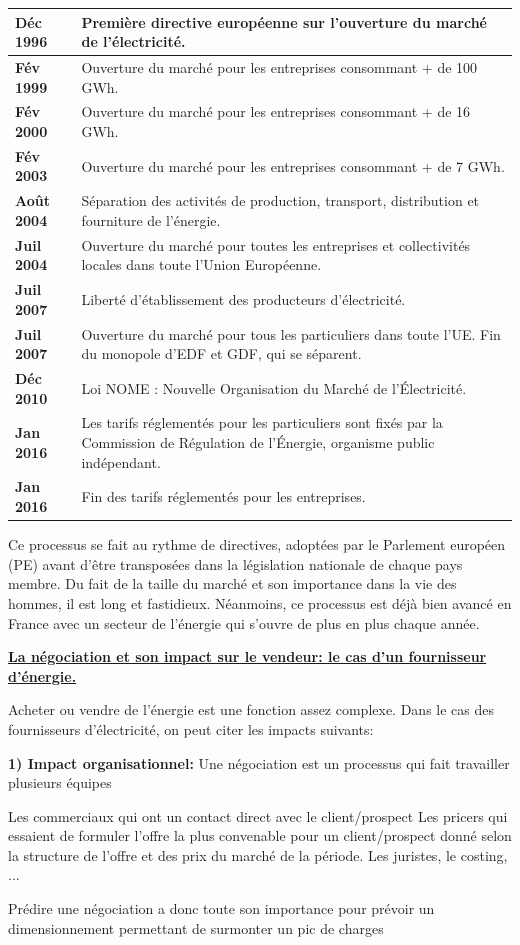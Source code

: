 \documentclass[12pt]{article}
\begin{document}
{\begin{center}
\begin{tabular}{|p{2cm}|p{13cm}|}
  \textbf{Déc 1996} & Première directive européenne sur l'ouverture du marché de l'électricité. \\
  \hline
 \textbf{Fév 1999} & Ouverture du marché pour les entreprises consommant + de 100 GWh. \\
  \hline
  \textbf{Fév 2000} & Ouverture du marché pour les entreprises consommant + de 16 GWh. \\
  \hline
 \textbf{Fév 2003} & Ouverture du marché pour les entreprises consommant + de 7 GWh. \\
  \hline
  \textbf{Août 2004} &	Séparation des activités de production, transport, distribution et fourniture de l'énergie.\\
  \hline
  \textbf{Juil 2004} & Ouverture du marché pour toutes les entreprises et collectivités locales dans toute l'Union Européenne.\\
  \hline
  \textbf{Juil 2007} & Liberté d'établissement des producteurs d'électricité.\\
  \hline
  \textbf{Juil 2007} & Ouverture du marché pour tous les particuliers dans toute l'UE. Fin du monopole d'EDF et GDF, qui se séparent.\\
  \hline
  \textbf{Déc 2010} & Loi NOME : Nouvelle Organisation du Marché de l’Électricité.\\
\hline
\textbf{Jan 2016} & Les tarifs réglementés pour les particuliers sont fixés par la Commission de Régulation de l’Énergie, organisme public indépendant.\\
 \hline
  \textbf{Jan 2016} & Fin des tarifs réglementés pour les entreprises.\\
  \hline
\end{tabular}
\end{center}

 Ce processus se fait au rythme de directives, adoptées par le Parlement européen (PE) avant d'être transposées dans la législation nationale de chaque pays membre. Du fait de la taille du marché et son importance dans la vie des hommes, il est long et fastidieux. Néanmoins, ce processus est déjà bien avancé en France avec un secteur de l'énergie qui s'ouvre de plus en plus chaque année.


\textbf{\underline{La négociation et son impact sur le vendeur: le cas d’un fournisseur d'énergie.}}

Acheter ou vendre de l'énergie est une fonction assez complexe. Dans le cas des fournisseurs d’électricité, on peut citer les impacts suivants:

\textbf{ 1)  Impact organisationnel:}
Une négociation est un processus qui fait travailler plusieurs équipes
\begin{outline}
\1 Les commerciaux qui ont un contact direct avec le client/prospect 
\1 Les pricers qui essaient de formuler l’offre la plus convenable pour un client/prospect donné selon la structure de l’offre et des prix du marché de la période.
\1 Les juristes, le costing, ...
\end{outline}
Prédire une négociation a donc toute son importance pour prévoir un dimensionnement permettant de surmonter un pic de charges

}
\end{document}
